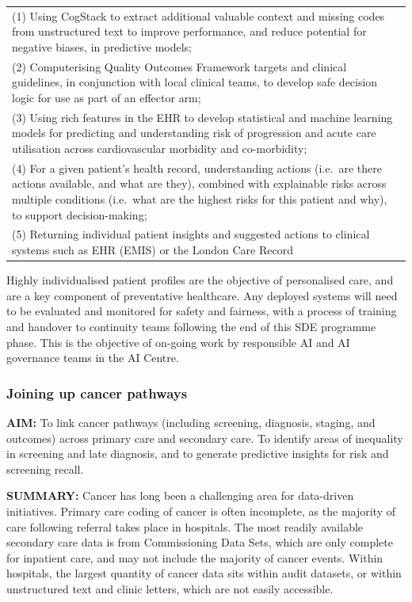 \documentclass[
  letterpaper,
  DIV=11,
  numbers=noendperiod]{scrartcl}
\begin{document}
\begin{longtable}[]{@{}
  >{\raggedright\arraybackslash}p{}@{}}
\toprule\noalign{}
\endhead
\bottomrule\noalign{}
\endlastfoot
(1) Using CogStack to extract additional valuable context and missing
codes from unstructured text to improve performance, and reduce
potential for negative biases, in predictive models; \\
(2) Computerising Quality Outcomes Framework targets and clinical
guidelines, in conjunction with local clinical teams, to develop safe
decision logic for use as part of an effector arm; \\
(3) Using rich features in the EHR to develop statistical and machine
learning models for predicting and understanding risk of progression and
acute care utilisation across cardiovascular morbidity and
co-morbidity; \\
(4) For a given patient's health record, understanding actions (i.e.~are
there actions available, and what are they), combined with explainable
risks across multiple conditions (i.e.~what are the highest risks for
this patient and why), to support decision-making; \\
(5) Returning individual patient insights and suggested actions to
clinical systems such as EHR (EMIS) or the London Care Record \\
\end{longtable}

Highly individualised patient profiles are the objective of personalised
care, and are a key component of preventative healthcare. Any deployed
systems will need to be evaluated and monitored for safety and fairness,
with a process of training and handover to continuity teams following
the end of this SDE programme phase. This is the objective of on-going
work by responsible AI and AI governance teams in the AI Centre.

\subsubsection{Joining up cancer
pathways}\label{joining-up-cancer-pathways}

\textbf{AIM:} To link cancer pathways (including screening, diagnosis,
staging, and outcomes) across primary care and secondary care. To
identify areas of inequality in screening and late diagnosis, and to
generate predictive insights for risk and screening recall.

\textbf{SUMMARY:} Cancer has long been a challenging area for
data-driven initiatives. Primary care coding of cancer is often
incomplete, as the majority of care following referral takes place in
hospitals. The most readily available secondary care data is from
Commissioning Data Sets, which are only complete for inpatient care, and
may not include the majority of cancer events. Within hospitals, the
largest quantity of cancer data sits within audit datasets, or within
unstructured text and clinic letters, which are not easily accessible.
\end{document}
